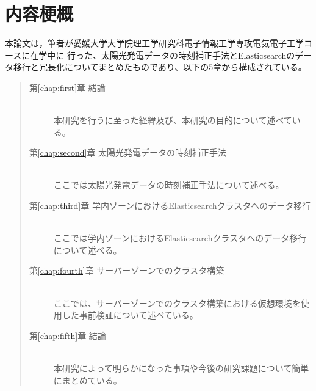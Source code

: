 \chapter*{内容梗概}

本論文は，筆者が愛媛大学大学院理工学研究科電子情報工学専攻電気電子工学コースに在学中に
行った、太陽光発電データの時刻補正手法とElasticsearchのデータ移行と冗長化についてまとめたものであり、以下の5章から構成されている。\\

\begin{quote}
      \begin{description}

            \item[第\ref{chap:first}章 緒論]\ \\
            本研究を行うに至った経緯及び、本研究の目的について述べている。
            \vspace{3.0mm}
            
            \item[第\ref{chap:second}章 太陽光発電データの時刻補正手法]\ \\
            ここでは太陽光発電データの時刻補正手法について述べる。
            \vspace{3.0mm}
            
            \item[第\ref{chap:third}章 学内ゾーンにおけるElasticsearchクラスタへのデータ移行]\ \\
            ここでは学内ゾーンにおけるElasticsearchクラスタへのデータ移行について述べる。
            \vspace{3.0mm}
            
            \item[第\ref{chap:fourth}章 サーバーゾーンでのクラスタ構築]\ \\
            ここでは、サーバーゾーンでのクラスタ構築における仮想環境を使用した事前検証について述べている。
            \vspace{3.0mm}
            
            \item[第\ref{chap:fifth}章 結論]\ \\
            本研究によって明らかになった事項や今後の研究課題について簡単にまとめている。
      \end{description}
\end{quote}
